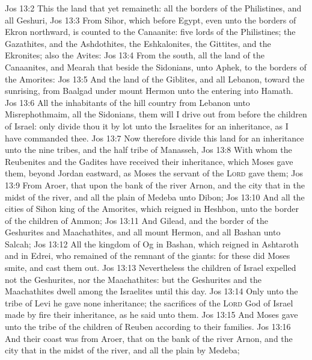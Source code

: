 \vs Jos 13:2 This  the land that yet remaineth: all the borders of the Philistines, and all Geshuri,
\vs Jos 13:3 From Sihor, which  before Egypt, even unto the borders of Ekron northward,  is counted to the Canaanite: five lords of the Philistines; the Gazathites, and the Ashdothites, the Eshkalonites, the Gittites, and the Ekronites; also the Avites:
\vs Jos 13:4 From the south, all the land of the Canaanites, and Mearah that  beside the Sidonians, unto Aphek, to the borders of the Amorites:
\vs Jos 13:5 And the land of the Giblites, and all Lebanon, toward the sunrising, from Baalgad under mount Hermon unto the entering into Hamath.
\vs Jos 13:6 All the inhabitants of the hill country from Lebanon unto Misrephothmaim,  all the Sidonians, them will I drive out from before the children of Israel: only divide thou it by lot unto the Israelites for an inheritance, as I have commanded thee.
\vs Jos 13:7 Now therefore divide this land for an inheritance unto the nine tribes, and the half tribe of Manasseh,
\vs Jos 13:8 With whom the Reubenites and the Gadites have received their inheritance, which Moses gave them, beyond Jordan eastward,  as Moses the servant of the \textsc{Lord} gave them;
\vs Jos 13:9 From Aroer, that  upon the bank of the river Arnon, and the city that  in the midst of the river, and all the plain of Medeba unto Dibon;
\vs Jos 13:10 And all the cities of Sihon king of the Amorites, which reigned in Heshbon, unto the border of the children of Ammon;
\vs Jos 13:11 And Gilead, and the border of the Geshurites and Maachathites, and all mount Hermon, and all Bashan unto Salcah;
\vs Jos 13:12 All the kingdom of Og in Bashan, which reigned in Ashtaroth and in Edrei, who remained of the remnant of the giants: for these did Moses smite, and cast them out.
\vs Jos 13:13 Nevertheless the children of Israel expelled not the Geshurites, nor the Maachathites: but the Geshurites and the Maachathites dwell among the Israelites until this day.
\vs Jos 13:14 Only unto the tribe of Levi he gave none inheritance; the sacrifices of the \textsc{Lord} God of Israel made by fire  their inheritance, as he said unto them.
\vs Jos 13:15 And Moses gave unto the tribe of the children of Reuben  according to their families.
\vs Jos 13:16 And their coast was from Aroer, that  on the bank of the river Arnon, and the city that  in the midst of the river, and all the plain by Medeba;
